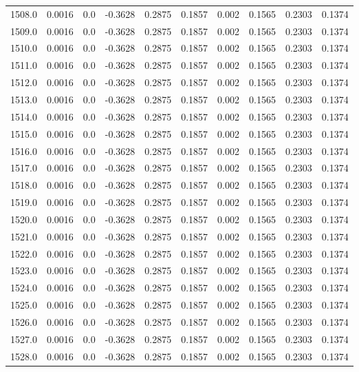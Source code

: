 \begin{longtable}{lrrrrrrrrr}
1508.0 & 0.0016 & 0.0 & -0.3628 & 0.2875 & 0.1857 & 0.002 & 0.1565 & 0.2303 & 0.1374 \\
1509.0 & 0.0016 & 0.0 & -0.3628 & 0.2875 & 0.1857 & 0.002 & 0.1565 & 0.2303 & 0.1374 \\
1510.0 & 0.0016 & 0.0 & -0.3628 & 0.2875 & 0.1857 & 0.002 & 0.1565 & 0.2303 & 0.1374 \\
1511.0 & 0.0016 & 0.0 & -0.3628 & 0.2875 & 0.1857 & 0.002 & 0.1565 & 0.2303 & 0.1374 \\
1512.0 & 0.0016 & 0.0 & -0.3628 & 0.2875 & 0.1857 & 0.002 & 0.1565 & 0.2303 & 0.1374 \\
1513.0 & 0.0016 & 0.0 & -0.3628 & 0.2875 & 0.1857 & 0.002 & 0.1565 & 0.2303 & 0.1374 \\
1514.0 & 0.0016 & 0.0 & -0.3628 & 0.2875 & 0.1857 & 0.002 & 0.1565 & 0.2303 & 0.1374 \\
1515.0 & 0.0016 & 0.0 & -0.3628 & 0.2875 & 0.1857 & 0.002 & 0.1565 & 0.2303 & 0.1374 \\
1516.0 & 0.0016 & 0.0 & -0.3628 & 0.2875 & 0.1857 & 0.002 & 0.1565 & 0.2303 & 0.1374 \\
1517.0 & 0.0016 & 0.0 & -0.3628 & 0.2875 & 0.1857 & 0.002 & 0.1565 & 0.2303 & 0.1374 \\
1518.0 & 0.0016 & 0.0 & -0.3628 & 0.2875 & 0.1857 & 0.002 & 0.1565 & 0.2303 & 0.1374 \\
1519.0 & 0.0016 & 0.0 & -0.3628 & 0.2875 & 0.1857 & 0.002 & 0.1565 & 0.2303 & 0.1374 \\
1520.0 & 0.0016 & 0.0 & -0.3628 & 0.2875 & 0.1857 & 0.002 & 0.1565 & 0.2303 & 0.1374 \\
1521.0 & 0.0016 & 0.0 & -0.3628 & 0.2875 & 0.1857 & 0.002 & 0.1565 & 0.2303 & 0.1374 \\
1522.0 & 0.0016 & 0.0 & -0.3628 & 0.2875 & 0.1857 & 0.002 & 0.1565 & 0.2303 & 0.1374 \\
1523.0 & 0.0016 & 0.0 & -0.3628 & 0.2875 & 0.1857 & 0.002 & 0.1565 & 0.2303 & 0.1374 \\
1524.0 & 0.0016 & 0.0 & -0.3628 & 0.2875 & 0.1857 & 0.002 & 0.1565 & 0.2303 & 0.1374 \\
1525.0 & 0.0016 & 0.0 & -0.3628 & 0.2875 & 0.1857 & 0.002 & 0.1565 & 0.2303 & 0.1374 \\
1526.0 & 0.0016 & 0.0 & -0.3628 & 0.2875 & 0.1857 & 0.002 & 0.1565 & 0.2303 & 0.1374 \\
1527.0 & 0.0016 & 0.0 & -0.3628 & 0.2875 & 0.1857 & 0.002 & 0.1565 & 0.2303 & 0.1374 \\
1528.0 & 0.0016 & 0.0 & -0.3628 & 0.2875 & 0.1857 & 0.002 & 0.1565 & 0.2303 & 0.1374 \\

\end{longtable}
